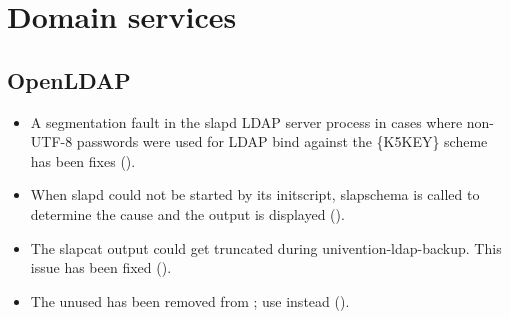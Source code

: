 




\section{Domain services}

\subsection{OpenLDAP}
\begin{itemize}
\item A segmentation fault in the slapd LDAP server process in cases where
non-UTF-8 passwords were used for LDAP bind against the \{K5KEY\} scheme has
been fixes ().

\item When slapd could not be started by its initscript, slapschema is called to determine the cause and the output is displayed ().

\item The slapcat output could get truncated during univention-ldap-backup.
This issue has been fixed ().

\item The unused  has been removed from ; use  instead ().
\end{itemize}

